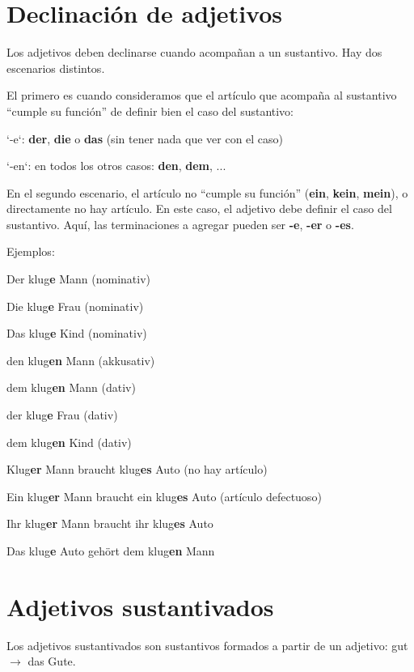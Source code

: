 \section{Declinación de adjetivos}
Los adjetivos deben declinarse cuando acompañan a un sustantivo. Hay dos escenarios distintos.

El primero es cuando consideramos que el artículo que acompaña al sustantivo ``cumple su función'' de definir bien el caso del sustantivo:
\begin{myitemize}
\item `-e`: \textbf{der}, \textbf{die} o \textbf{das} (sin tener nada que ver con el caso)
\item `-en`: en todos los otros casos: \textbf{den}, \textbf{dem}, ...
\end{myitemize}

En el segundo escenario, el artículo no ``cumple su función'' (\textbf{ein}, \textbf{kein}, \textbf{mein}), o directamente no hay artículo. En este caso, el adjetivo debe definir el caso del sustantivo. Aquí, las terminaciones a agregar pueden ser \textbf{-e}, \textbf{-er} o \textbf{-es}.

Ejemplos:
\begin{myitemize}
\item Der klug\textbf{e} Mann (nominativ)
\item Die klug\textbf{e} Frau (nominativ)
\item Das klug\textbf{e} Kind (nominativ)
\item den klug\textbf{en} Mann (akkusativ)
\item dem klug\textbf{en} Mann (dativ)
\item der klug\textbf{e} Frau (dativ)
\item dem klug\textbf{en} Kind (dativ)
\item Klug\textbf{er} Mann braucht klug\textbf{es} Auto (no hay artículo)
\item Ein klug\textbf{er} Mann braucht ein klug\textbf{es} Auto (artículo defectuoso)
\item Ihr klug\textbf{er} Mann braucht ihr klug\textbf{es} Auto
\item Das klug\textbf{e} Auto gehört dem klug\textbf{en} Mann
\end{myitemize}


\section{Adjetivos sustantivados}
Los adjetivos sustantivados son sustantivos formados a partir de un adjetivo: gut $\rightarrow$ das Gute.

